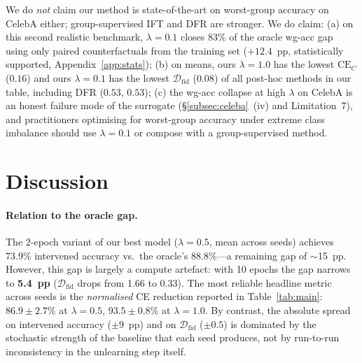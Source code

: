 \documentclass{article}
\newcommand{\CE}{\mathrm{CE}}
\newcommand{\Dfid}{\mathcal{D}_{\mathrm{fid}}}
\begin{document}
We do \emph{not} claim our method is state-of-the-art on worst-group accuracy
on CelebA either; group-supervised IFT and DFR are stronger.  We do claim:
(a) on this second realistic benchmark, $\lambda{=}0.1$ closes 83\% of the
oracle wg-acc gap using only paired counterfactuals from the training set
($+12.4$~pp, statistically supported, Appendix~\ref{app:stats});
(b) on means, ours $\lambda{=}1.0$ has the lowest $\CE_C$ ($0.16$) and
ours $\lambda{=}0.1$ has the lowest $\Dfid$ ($0.08$) of all post-hoc methods
in our table, including DFR ($0.53$, $0.53$);
(c) the wg-acc collapse at high $\lambda$ on CelebA is an honest failure
mode of the surrogate (\S\ref{subsec:celeba}~(iv) and Limitation~7), and
practitioners optimising for worst-group accuracy under extreme class
imbalance should use $\lambda{=}0.1$ or compose with a group-supervised
method.

\section{Discussion}
\label{sec:discussion}

\paragraph{Relation to the oracle gap.}
The 2-epoch variant of our best model ($\lambda{=}0.5$, mean across seeds)
achieves 73.9\% intervened accuracy vs.\ the oracle's 88.8\%—a remaining gap
of $\sim$15~pp.  However, this gap is largely a compute artefact: with 10
epochs the gap narrows to \textbf{5.4~pp} ($\Dfid$ drops from 1.66 to 0.33).
The most reliable headline metric across seeds is the \emph{normalised} CE
reduction reported in Table~\ref{tab:main}: $86.9 \pm 2.7\%$ at $\lambda{=}0.5$,
$93.5 \pm 0.8\%$ at $\lambda{=}1.0$.  By contrast, the absolute spread on
intervened accuracy ($\pm 9$~pp) and on $\Dfid$ ($\pm 0.5$) is dominated by the
stochastic strength of the baseline that each seed produces, not by run-to-run
inconsistency in the unlearning step itself.
\end{document}

